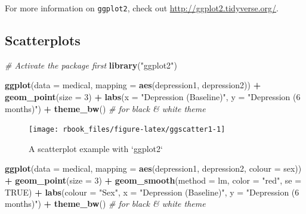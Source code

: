 \documentclass[]{book}
\newenvironment{Shaded}{\begin{snugshade}}{\end{snugshade}}
\newcommand{\CommentTok}[1]{\textcolor[rgb]{0.56,0.35,0.01}{\textit{#1}}}
\newcommand{\DataTypeTok}[1]{\textcolor[rgb]{0.13,0.29,0.53}{#1}}
\newcommand{\DecValTok}[1]{\textcolor[rgb]{0.00,0.00,0.81}{#1}}
\newcommand{\KeywordTok}[1]{\textcolor[rgb]{0.13,0.29,0.53}{\textbf{#1}}}
\newcommand{\NormalTok}[1]{#1}
\newcommand{\OperatorTok}[1]{\textcolor[rgb]{0.81,0.36,0.00}{\textbf{#1}}}
\newcommand{\OtherTok}[1]{\textcolor[rgb]{0.56,0.35,0.01}{#1}}
\newcommand{\StringTok}[1]{\textcolor[rgb]{0.31,0.60,0.02}{#1}}
\begin{document}
For more information on \texttt{ggplot2}, check out \url{http://ggplot2.tidyverse.org/}.

\hypertarget{scatterplots-1}{%
\subsection{Scatterplots}\label{scatterplots-1}}

\begin{Shaded}
\begin{Highlighting}[]
\CommentTok{# Activate the package first}
\KeywordTok{library}\NormalTok{(}\StringTok{"ggplot2"}\NormalTok{)}

\KeywordTok{ggplot}\NormalTok{(}\DataTypeTok{data =}\NormalTok{ medical, }
       \DataTypeTok{mapping =} \KeywordTok{aes}\NormalTok{(depression1, depression2)) }\OperatorTok{+}\StringTok{ }
\StringTok{  }\KeywordTok{geom_point}\NormalTok{(}\DataTypeTok{size =} \DecValTok{3}\NormalTok{) }\OperatorTok{+}
\StringTok{  }\KeywordTok{labs}\NormalTok{(}\DataTypeTok{x =} \StringTok{"Depression (Baseline)"}\NormalTok{, }
       \DataTypeTok{y =} \StringTok{"Depression (6 months)"}\NormalTok{) }\OperatorTok{+}
\StringTok{  }\KeywordTok{theme_bw}\NormalTok{() }\CommentTok{# for black & white theme}
\end{Highlighting}
\end{Shaded}

\begin{figure}

{\centering \texttt{[image: rbook\_files/figure-latex/ggscatter1-1]} 

}

\caption{A scatterplot example with `ggplot2`}\label{fig:ggscatter1}
\end{figure}

\begin{Shaded}
\begin{Highlighting}[]
\KeywordTok{ggplot}\NormalTok{(}\DataTypeTok{data =}\NormalTok{ medical, }
       \DataTypeTok{mapping =} \KeywordTok{aes}\NormalTok{(depression1, depression2, }\DataTypeTok{colour =}\NormalTok{ sex)) }\OperatorTok{+}\StringTok{ }
\StringTok{  }\KeywordTok{geom_point}\NormalTok{(}\DataTypeTok{size =} \DecValTok{3}\NormalTok{) }\OperatorTok{+}
\StringTok{  }\KeywordTok{geom_smooth}\NormalTok{(}\DataTypeTok{method =}\NormalTok{ lm, }\DataTypeTok{color =} \StringTok{"red"}\NormalTok{, }\DataTypeTok{se =} \OtherTok{TRUE}\NormalTok{) }\OperatorTok{+}
\StringTok{  }\KeywordTok{labs}\NormalTok{(}\DataTypeTok{colour =} \StringTok{"Sex"}\NormalTok{, }
       \DataTypeTok{x =} \StringTok{"Depression (Baseline)"}\NormalTok{, }
       \DataTypeTok{y =} \StringTok{"Depression (6 months)"}\NormalTok{) }\OperatorTok{+}
\StringTok{  }\KeywordTok{theme_bw}\NormalTok{() }\CommentTok{# for black & white theme}
\end{Highlighting}
\end{Shaded}
\end{document}
